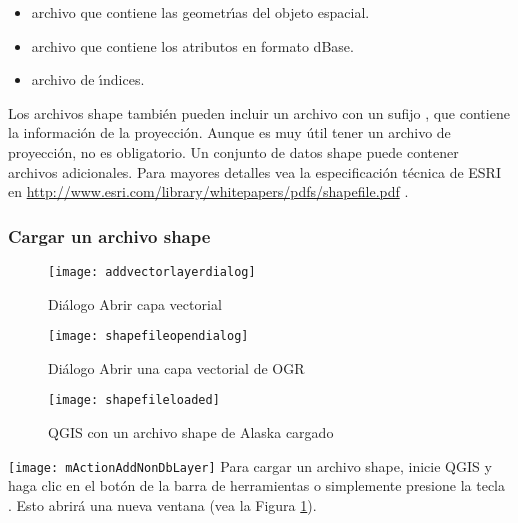 \begin{itemize}
\item {} archivo que contiene las geometr\'{\i}as del objeto espacial.
\item {} archivo que contiene los atributos en formato dBase.
\item {} archivo de \'{\i}ndices.
\end{itemize}

Los archivos shape también pueden incluir un archivo con un sufijo , que contiene la informaci\'on de la proyecci\'on. Aunque es muy \'util tener un archivo de proyecci\'on, no es obligatorio. Un conjunto de datos shape puede contener archivos adicionales. Para mayores detalles vea la especificaci\'on t\'ecnica de ESRI en  \url{http://www.esri.com/library/whitepapers/pdfs/shapefile.pdf}
.

\subsubsection{Cargar un archivo shape}\label{sec:load_shapefile}

\begin{figure}[ht]
   \begin{center}
   \caption{Di\'alogo Abrir capa vectorial \nixcaption}\label{fig:addvectorlayer}\smallskip
   \texttt{[image: addvectorlayerdialog]}
\end{center} 
\end{figure}

\begin{figure}[ht]
   \begin{center}
   \caption{Di\'alogo Abrir una capa vectorial de OGR \nixcaption}\label{fig:openshapefile}\smallskip
   \texttt{[image: shapefileopendialog]}
\end{center} 
\end{figure}

\begin{figure}[ht]
   \begin{center}
   \caption{QGIS con un archivo shape de Alaska cargado \nixcaption}\label{fig:loadedshapefile}\smallskip
   \texttt{[image: shapefileloaded]}
\end{center} 
\end{figure}

\texttt{[image: mActionAddNonDbLayer]} Para cargar un archivo shape, inicie
QGIS y haga clic en el bot\'on  de la barra de herramientas
 o simplemente presione la tecla . Esto abrir\'a una nueva ventana (vea la Figura \ref{fig:addvectorlayer}).

